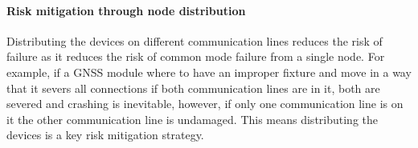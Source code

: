 \paragraph{Risk mitigation through node distribution}
Distributing the devices on different communication lines reduces the risk of failure as it reduces the risk of common mode failure from a single node. For example, if a GNSS module where to have an improper fixture and move in a way that it severs all connections if both communication lines are in it, both are severed and crashing is inevitable, however, if only one communication line is on it the other communication line is undamaged. This means distributing the devices is a key risk mitigation strategy.

